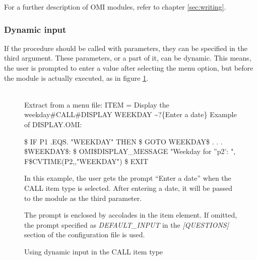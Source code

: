 \documentclass[a4paper]{book}
\begin{document}
For a further description of OMI modules, refer to chapter \ref{sec:writing}.

\subsubsection{Dynamic input}\label{para:dyninput}

If the procedure should be called with parameters, they can be specified in 
the third argument. These parameters, or a part of it, can be 
dynamic. This means, the user is prompted to enter a 
value after selecting the menu option, but before the module is actually 
executed, as in figure \ref{fig:dyninput}.

\begin{figure}[h!tb]
\begin{minipage}[h!tb]{\textwidth}
\hrulefill \\
\noindent Extract from a menu file: \newline
\textsf{ITEM = Display the weekday{\#}CALL{\#}DISPLAY WEEKDAY \~{}?{\{}Enter a date{\}}} \newline
\vspace{1mm}
\noindent Example of DISPLAY.OMI: \newline
\begin{ttfamily}
{\$} IF P1 .EQS. "WEEKDAY" THEN {\$} GOTO WEEKDAY{\$} \newline
 . \newline
 . \newline
 . \newline
{\$}WEEKDAY{\$}: \newline
{\$} OMI{\$}DISPLAY{\_}MESSAGE "Weekday for ''p2': ", F{\$}CVTIME(P2,,"WEEKDAY") \newline
{\$} EXIT \newline
\end{ttfamily}
\noindent In this example, the user gets the prompt ``Enter a date'' when the CALL item 
type is selected. After entering a date, 
it will be passed to the module as the third parameter.

The prompt is enclosed by accolades in the item element. If omitted, the 
prompt specified as \textsl{DEFAULT{\_}INPUT} in the \textsl{[QUESTIONS]} section of the 
configuration file is used.
\caption{Using dynamic input in the CALL item type}\label{fig:dyninput}
\hrulefill
\end{minipage}
\end{figure}
\end{document}
